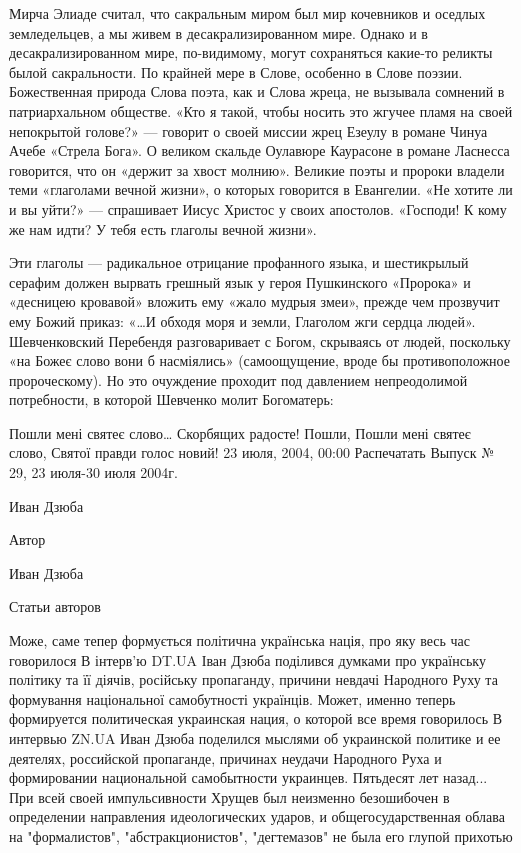 Мирча Элиаде считал, что сакральным миром был мир кочевников и оседлых
земледельцев, а мы живем в десакрализированном мире. Однако и в
десакрализированном мире, по-видимому, могут сохраняться какие-то реликты былой
сакральности. По крайней мере в Слове, особенно в Слове поэзии. Божественная
природа Слова поэта, как и Слова жреца, не вызывала сомнений в патриархальном
обществе. «Кто я такой, чтобы носить это жгучее пламя на своей непокрытой
голове?» --- говорит о своей миссии жрец Езеулу в романе Чинуа Ачебе «Стрела
Бога». О великом скальде Оулавюре Каурасоне в романе Ласнесса говорится, что он
«держит за хвост молнию». Великие поэты и пророки владели теми «глаголами
вечной жизни», о которых говорится в Евангелии. «Не хотите ли и вы уйти?» —
спрашивает Иисус Христос у своих апостолов. «Господи! К кому же нам идти? У
тебя есть глаголы вечной жизни».

Эти глаголы --- радикальное отрицание профанного языка, и шестикрылый серафим
должен вырвать грешный язык у героя Пушкинского «Пророка» и «десницею кровавой»
вложить ему «жало мудрыя змеи», прежде чем прозвучит ему Божий приказ: «…И
обходя моря и земли, Глаголом жги сердца людей». Шевченковский Перебендя
разговаривает с Богом, скрываясь от людей, поскольку «на Божеє слово вони б
насміялись» (самоощущение, вроде бы противоположное пророческому). Но это
очуждение проходит под давлением непреодолимой потребности, в которой Шевченко
молит Богоматерь:

Пошли мені святеє слово…
Скорбящих радосте! Пошли,
Пошли мені святеє слово,
Святої правди голос новий!
 23 июля, 2004, 00:00
Распечатать
Выпуск № 29, 23 июля-30 июля 2004г.

    Иван Дзюба

Автор

    Иван Дзюба

Статьи авторов

    Може, саме тепер формується політична українська нація, про яку весь час говорилося В інтерв'ю DT.UA Іван Дзюба поділився думками про українську політику та її діячів, російську пропаганду, причини невдачі Народного Руху та формування національної самобутності українців.
    Может, именно теперь формируется политическая украинская нация, о которой все время говорилось В интервью ZN.UA Иван Дзюба поделился мыслями об украинской политике и ее деятелях, российской пропаганде, причинах неудачи Народного Руха и формировании национальной самобытности украинцев.
    Пятьдесят лет назад... При всей своей импульсивности Хрущев был неизменно безошибочен в определении направления идеологических ударов, и общегосударственная облава на "формалистов", "абстракционистов", "дегтемазов" не была его глупой прихотью

